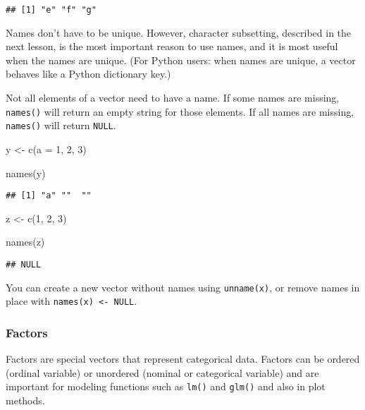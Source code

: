 \documentclass[
]{book}
\newenvironment{Shaded}{\begin{snugshade}}{\end{snugshade}}
\newcommand{\AttributeTok}[1]{\textcolor[rgb]{0.77,0.63,0.00}{#1}}
\newcommand{\DecValTok}[1]{\textcolor[rgb]{0.00,0.00,0.81}{#1}}
\newcommand{\FunctionTok}[1]{\textcolor[rgb]{0.00,0.00,0.00}{#1}}
\newcommand{\NormalTok}[1]{#1}
\newcommand{\OtherTok}[1]{\textcolor[rgb]{0.56,0.35,0.01}{#1}}
\begin{document}
\begin{verbatim}
## [1] "e" "f" "g"
\end{verbatim}

Names don't have to be unique. However, character subsetting, described in the next lesson, is the most important reason to use names, and it is most useful when the names are unique. (For Python users: when names are unique, a vector behaves like a Python dictionary key.)

Not all elements of a vector need to have a name. If some names are missing, \texttt{names()} will return an empty string for those elements. If all names are missing, \texttt{names()} will return \texttt{NULL}.

\begin{Shaded}
\begin{Highlighting}[]
\NormalTok{y }\OtherTok{\textless{}{-}} \FunctionTok{c}\NormalTok{(}\AttributeTok{a =} \DecValTok{1}\NormalTok{, }\DecValTok{2}\NormalTok{, }\DecValTok{3}\NormalTok{)}

\FunctionTok{names}\NormalTok{(y)}
\end{Highlighting}
\end{Shaded}

\begin{verbatim}
## [1] "a" ""  ""
\end{verbatim}

\begin{Shaded}
\begin{Highlighting}[]
\NormalTok{z }\OtherTok{\textless{}{-}} \FunctionTok{c}\NormalTok{(}\DecValTok{1}\NormalTok{, }\DecValTok{2}\NormalTok{, }\DecValTok{3}\NormalTok{)}

\FunctionTok{names}\NormalTok{(z)}
\end{Highlighting}
\end{Shaded}

\begin{verbatim}
## NULL
\end{verbatim}

You can create a new vector without names using \texttt{unname(x)}, or remove names in place with \texttt{names(x)\ \textless{}-\ NULL}.

\hypertarget{factors}{%
\subsubsection{Factors}\label{factors}}

Factors are special vectors that represent categorical data. Factors can be ordered (ordinal variable) or unordered (nominal or categorical variable) and are important for modeling functions such as \texttt{lm()} and \texttt{glm()} and also in plot methods.
\end{document}
